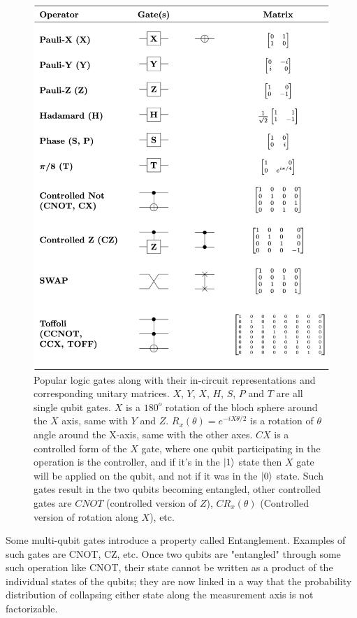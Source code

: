 \begin{figure}[ht]
    \centering
    \includegraphics[width=0.7\linewidth]{figures/quantum/quantum_logic_gates.png}
    \caption[List of Logic Gates]{Popular logic gates along with their in-circuit representations and corresponding unitary matrices. $X$, $Y$, $X$, $H$, $S$, $P$ and $T$ are all single qubit gates. $X$ is a $180^o$ rotation of the bloch sphere around the $X$ axis, same with $Y$ and $Z$. $R_x(\theta) = e^{-i X \theta / 2}$ is a rotation of $\theta$ angle around the X-axis, same with the other axes. $CX$ is a controlled form of the $X$ gate, where one qubit participating in the operation is the controller, and if it's in the $\ket{1}$ state then $X$ gate will be applied on the qubit, and not if it was in the $\ket{0}$ state. Such gates result in the two qubits becoming entangled, other controlled gates are $CNOT$ (controlled version of $Z$), $CR_x(\theta)$ (Controlled version of rotation along $X$), etc. \cite{book-nielsen-chuang}}
    \label{fig:quantum-unitary-gates}
\end{figure}

Some multi-qubit gates introduce a property called Entanglement. Examples of such gates are CNOT, CZ, etc. Once two qubits are "entangled" through some such operation like CNOT, their state cannot be written as a product of the individual states of the qubits; they are now linked in a way that the probability distribution of collapsing either state along the measurement axis is not factorizable. 


